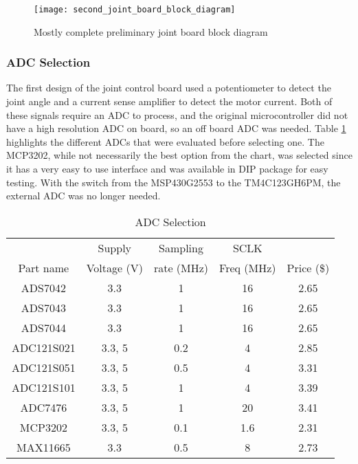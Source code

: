 \begin{figure}[H]
	\centering
	\texttt{[image: second\_joint\_board\_block\_diagram]}
	\caption{Mostly complete preliminary joint board block diagram}
	\label{fig:2nd_joint_board_block}
\end{figure}

\subsubsection{ADC Selection}
The first design of the joint control board used a potentiometer to detect the joint angle and a current sense amplifier to detect the motor current. Both of these signals require an ADC to process, and the original microcontroller did not have a high resolution ADC on board, so an off board ADC was needed. Table \ref{tbl:ADC Selection} highlights the different ADCs that were evaluated before selecting one. The MCP3202, while not necessarily the best option from the chart, was selected since it has a very easy to use interface and was available in DIP package for easy testing. With the switch from the MSP430G2553 to the TM4C123GH6PM, the external ADC was no longer needed.

\begin{table}[H]
	\centering
	\caption{ADC Selection}
	
	\begin{tabular}{|c|c|c|c|c|}
		\hline
		& Supply & Sampling & SCLK & \\
		Part name & Voltage (V) & rate (MHz) & Freq (MHz) & Price (\$) \\
		\hline
		ADS7042 & 3.3 & 1 & 16 & 2.65 \\
		
		ADS7043 & 3.3 & 1 & 16 & 2.65 \\
		
		ADS7044 & 3.3 & 1 & 16 & 2.65 \\
		
		ADC121S021 & 3.3, 5 & 0.2 & 4 & 2.85 \\
		
		ADC121S051 & 3.3, 5 & 0.5 & 4 & 3.31 \\
		
		ADC121S101 & 3.3, 5 & 1 & 4 & 3.39 \\
		
		ADC7476 & 3.3, 5 & 1 & 20 & 3.41 \\
		
		MCP3202 & 3.3, 5 & 0.1 & 1.6 & 2.31 \\
		
		MAX11665 & 3.3 & 0.5 & 8 & 2.73 \\
		\hline
	\end{tabular}
	
	\label{tbl:ADC Selection}
\end{table}

